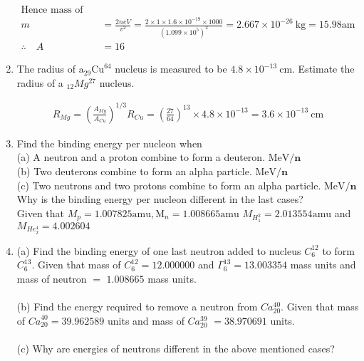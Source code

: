 \begin{enumerate}
\begin{answer}
\begin{align*}
		\text{Hence mass of ion}\\
		m&=\frac{2 n e V}{v^2}=\frac{2 \times 1 \times 1.6 \times 10^{-19} \times 1000}{\left(1.099 \times 10^5\right)^2}=2.667 \times 10^{-26} \mathrm{~kg}=15.98 \mathrm{am} \\
		\therefore \quad A&=16
		\end{align*}
	\end{answer}
	\item  The radius of $\mathrm{a}_{29} \mathrm{Cu}^{64}$ nucleus is measured to be $4.8 \times 10^{-13} \mathrm{~cm}$. Estimate the radius of a ${ }_{12} M g^{27}$ nucleus.
	\begin{answer}
		\begin{align*}
		R_{M g}=\left(\frac{A_{M g}}{A_{C u}}\right)^{1 / 3} R_{C u}=\left(\frac{27}{64}\right)^{13} \times 4.8 \times 10^{-13}=3.6 \times 10^{-13} \mathrm{~cm}
		\end{align*}
	\end{answer}
	\item  Find the binding energy per nucleon when\\
	(a) A neutron and a proton combine to form a deuteron. $\mathrm{MeV} / \mathbf{n}$\\
	(b) Two deuterons combine to form an alpha particle. $\mathrm{MeV} / \mathbf{n}$\\
	(c) Two neutrons and two protons combine to form an alpha particle. $\mathrm{MeV} / \mathbf{n}$\\
	Why is the binding energy per nucleon different in the last cases?\\
	Given that $M_p=1.007825 \mathrm{amu}, \mathrm{M}_{n}=1.008665 \mathrm{amu}$
	$M_{H_1^2}=2.013554 \mathrm{amu}$ and $M_{He_2^4}=4.002604$

	\item  (a) Find the binding energy of one last neutron added to nucleus ${C}_6^{12}$ to form ${C}_6^{13}$. Given that mass of $C_{6}^{12}=12.000000$ and $\Gamma_6^{13}=13.003354$ mass units and mass of neutron $=$ $1.008665$ mass units.\\\\
	(b) Find the energy required to remove a neutron from $C a_{20}^{40}$. Given that mass of ${Ca}_{20}^{40}=39.962589$ units and mass of $C a_{20}^{39}$ $=38.970691$ units.\\\\
	(c) Why are energies of neutrons different in the above mentioned cases?
	
	
	
	
\end{enumerate}




